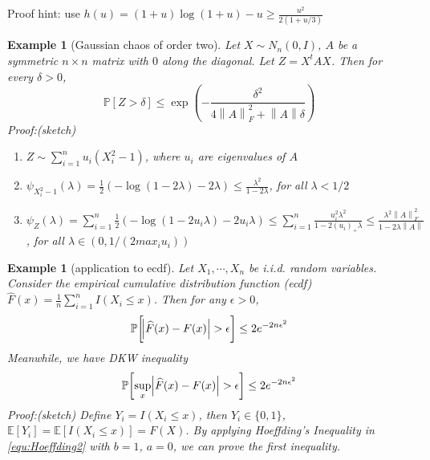 \documentclass[10pt]{article}
\newtheorem{example}[ex]{Example}
\newcommand{\Expect}[1]{\mathbb{E}\!\left[#1\right]}
\renewcommand{\P}[1]{\mathbb{P}\!\left[#1\right]}
\newcommand{\norm}[1]{\left\lVert #1 \right\rVert}
\renewcommand{\hat}{\widehat}
\begin{document}
Proof hint: use $h(u) = (1+u) \log{(1+u)} -u \ge \frac{u^2}{2(1+u/3)}$


\begin{example}[Gaussian chaos of order two]
Let $X \sim N_n(0, I)$, $A$ be a symmetric $n \times n$ matrix with $0$ along the diagonal.
Let $Z = X^t AX$. Then for every $\delta > 0$,
\begin{equation}
\P{Z > \delta} \le \exp{(- \frac{\delta^2}{4\norm{A}_F^2 + \norm{A} \delta} )} 
\end{equation}
Proof:(sketch)
\begin{enumerate}
\item $Z \sim \sum_{i=1}^n u_i (X_i^2 -1)$, where $u_i$ are eigenvalues of $A$
\item $\psi_{X_i^2 -1} (\lambda) = \frac{1}{2} (- \log(1-2\lambda) -2\lambda) \le \frac{\lambda^2}{1-2\lambda}$, for all $\lambda < 1/2$
\item $\psi_{Z} (\lambda) = \sum_{i=1}^{n} \frac{1}{2} (- \log(1-2 u_i \lambda) -2 u_i \lambda) \le \sum_{i=1}^{n} \frac{u_i^2 \lambda^2}{1-2(u_i)_{+}\lambda} \le \frac{\lambda^2 \norm{A}_F^2}{1-2\lambda \norm{A}}$, for all $\lambda \in (0, 1/(2 max_i u_i))$
\end{enumerate}
\end{example}


\begin{example}[application to ecdf]
Let $X_1, \cdots, X_n$ be i.i.d. random variables. 
Consider the empirical cumulative distribution function (ecdf) 
$\hat{F}(x) = \frac{1}{n} \sum_{i=1}^{n} I(X_i \le x)$. Then for any $\epsilon > 0$,
\begin{equation}
\P{\abs{\hat{F}(x) - F(x)} > \epsilon} \le 2 e^{-2n \epsilon^2}
\end{equation}
Meanwhile, we have DKW inequality
\begin{equation}
\P{\sup_x \abs{\hat{F}(x) - F(x)} > \epsilon} \le 2 e^{-2n \epsilon^2}
\end{equation}
Proof:(sketch)
Define $Y_i = I(X_i \le x)$, then $Y_i \in \{0, 1\}$, $\Expect{Y_i} = \Expect{I(X_i \le x)} = F(X)$. 
By applying Hoeffding's Inequality in \autoref{equ:Hoeffding2} with $b=1$, $a=0$, we can prove the
first inequality. 
\end{example}












\end{document}
